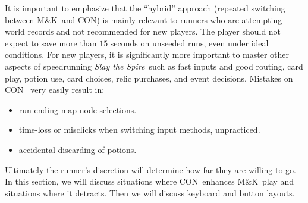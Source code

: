 \documentclass[12pt]{amsart}
\newcommand{\mk}{\textsf{M\&K}}
\newcommand{\con}{\textsf{CON}}
\newcommand{\sts}{\textit{Slay the Spire}}
\begin{document}
It is important to emphasize that the ``hybrid'' approach (repeated switching between \mk~and \con) is mainly relevant to runners who are attempting world records and not recommended for new players.  
The player should not expect to save more than $15$ seconds on unseeded runs, even under ideal conditions. 
For new players, it is significantly more important to master other aspects of speedrunning \sts~such as fast inputs and good routing, card play, potion use, card choices, relic purchases, and event decisions.  
Mistakes on \con~ very easily result in: 
\begin{itemize}
    \item run-ending map node selections.  
    \item time-loss or misclicks when switching input methods, unpracticed.  
    \item accidental discarding of potions.  
\end{itemize}

Ultimately the runner's discretion will determine how far they are willing to go.  
\\

In this section, we will discuss situations where \con~enhances \mk~play and situations where it detracts.  
Then we will discuss keyboard and button layouts.  
\end{document}
